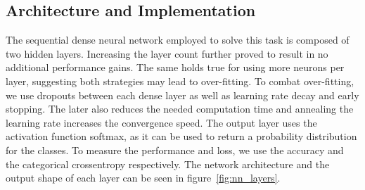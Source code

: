 \documentclass[
  12pt,
  bibliography=totoc,     %
  captions=tableheading,  %
  titlepage=firstiscover, %
]{scrartcl}
\begin{document}
\subsection{Architecture and Implementation}
The sequential dense neural network employed to solve this task is composed of two hidden layers. Increasing the layer count further proved to result in no additional
performance gains. The same holds true for using more neurons per layer, suggesting both strategies may lead to over-fitting.
To combat over-fitting, we use dropouts between each dense layer as well as learning rate decay and early stopping.
The later also reduces the needed computation time and annealing the learning rate increases the convergence speed. The output layer uses the activation function softmax,
as it can be used to return a probability distribution for the classes. To measure the performance and loss, we use the accuracy and the categorical crossentropy respectively.
The network architecture and the output shape of each layer can be seen in figure~\ref{fig:nn_layers}.
\end{document}
